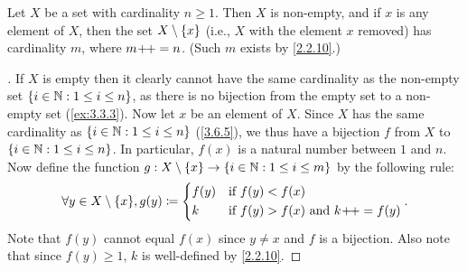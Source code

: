 \begin{lem}\label{3.6.9}
	Let \(X\) be a set with cardinality \(n \geq 1\).
	Then \(X\) is non-empty, and if \(x\) is any element of \(X\), then the set \(X \setminus \left\lbrace x\right\rbrace\) (i.e., \(X\) with the element \(x\) removed) has cardinality \(m\), where \(m\!+\!\!+ = n\).
	(Such \(m\) exists by \cref{2.2.10}.)
\end{lem}

\begin{proof}[]
	If \(X\) is empty then it clearly cannot have the same cardinality as the non-empty set \(\left\lbrace i \in \mathbb{N} : 1 \leq i \leq n\right\rbrace\), as there is no bijection from the empty set to a non-empty set (\cref{ex:3.3.3}).
	Now let \(x\) be an element of \(X\).
	Since \(X\) has the same cardinality as \(\left\lbrace i \in \mathbb{N} : 1 \leq i \leq n\right\rbrace\) (\cref{3.6.5}), we thus have a bijection \(f\) from \(X\) to \(\left\lbrace i \in \mathbb{N} : 1 \leq i \leq n\right\rbrace\).
	In particular, \(f(x)\) is a natural number between \(1\) and \(n\).
	Now define the function \(g : X \setminus \left\lbrace x\right\rbrace \to \left\lbrace i \in \mathbb{N} : 1 \leq i \leq m\right\rbrace\) by the following rule:
	\[
		\forall y \in X \setminus \set{x}, g(y) \coloneqq \begin{dcases}
			f(y) & \text{if } f(y) < f(x)                          \\
			k    & \text{if } f(y) > f(x) \text{ and } k\pp = f(y)
		\end{dcases}.
	\]
	Note that \(f(y)\) cannot equal \(f(x)\) since \(y \neq x\) and \(f\) is a bijection.
	Also note that since \(f(y) \geq 1\), \(k\) is well-defined by \cref{2.2.10}.


\end{proof}

